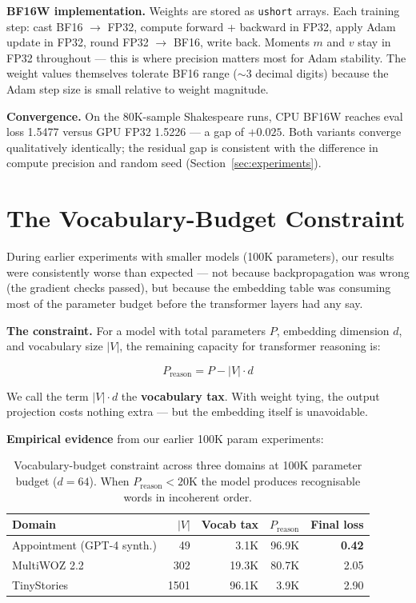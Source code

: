 \documentclass[11pt]{article}
\newcommand{\bfsixteenloss}{0.025}
\newcommand{\gpuvaloss}{1.5226}
\newcommand{\cpubfvaloss}{1.5477}
\begin{document}
\textbf{BF16W implementation.} Weights are stored as \texttt{ushort} arrays.
Each training step: cast BF16 $\to$ FP32, compute forward + backward in FP32,
apply Adam update in FP32, round FP32 $\to$ BF16, write back.
Moments $m$ and $v$ stay in FP32 throughout --- this is where precision matters most
for Adam stability. The weight values themselves tolerate BF16 range ($\sim$3 decimal
digits) because the Adam step size is small relative to weight magnitude.

\textbf{Convergence.} On the 80K-sample Shakespeare runs, CPU BF16W
reaches eval loss \cpubfvaloss{} versus GPU FP32 \gpuvaloss{} --- a gap of $+\bfsixteenloss$.
Both variants converge qualitatively identically; the residual gap is consistent
with the difference in compute precision and random seed (Section~\ref{sec:experiments}).

\section{The Vocabulary-Budget Constraint}

\label{sec:vocab}

During earlier experiments with smaller models (100K parameters), our results were
consistently worse than expected --- not because backpropagation was wrong (the
gradient checks passed), but because the embedding table was consuming most of the
parameter budget before the transformer layers had any say.

\textbf{The constraint.} For a model with total parameters $P$, embedding dimension
$d$, and vocabulary size $|V|$, the remaining capacity for transformer reasoning is:

\begin{equation}
P_{\text{reason}} = P - |V| \cdot d
\label{eq:vocab-budget}
\end{equation}

We call the term $|V| \cdot d$ the \textbf{vocabulary tax}. With weight tying, the
output projection costs nothing extra --- but the embedding itself is unavoidable.

\textbf{Empirical evidence} from our earlier 100K param experiments:

\begin{table}[H]
\centering
\begin{tabular}{lrrrr}
\toprule
Domain & $|V|$ & Vocab tax & $P_\text{reason}$ & Final loss \\
\midrule
Appointment (GPT-4 synth.) & 49   & 3.1K  & 96.9K & \textbf{0.42} \\
MultiWOZ 2.2               & 302  & 19.3K & 80.7K & 2.05 \\
TinyStories                & 1501 & 96.1K & 3.9K  & 2.90 \\
\bottomrule
\end{tabular}
\caption{Vocabulary-budget constraint across three domains at 100K parameter budget
($d{=}64$). When $P_\text{reason} < 20$K the model produces recognisable words in
incoherent order.}
\label{tab:vocab-budget}
\end{table}
\end{document}
